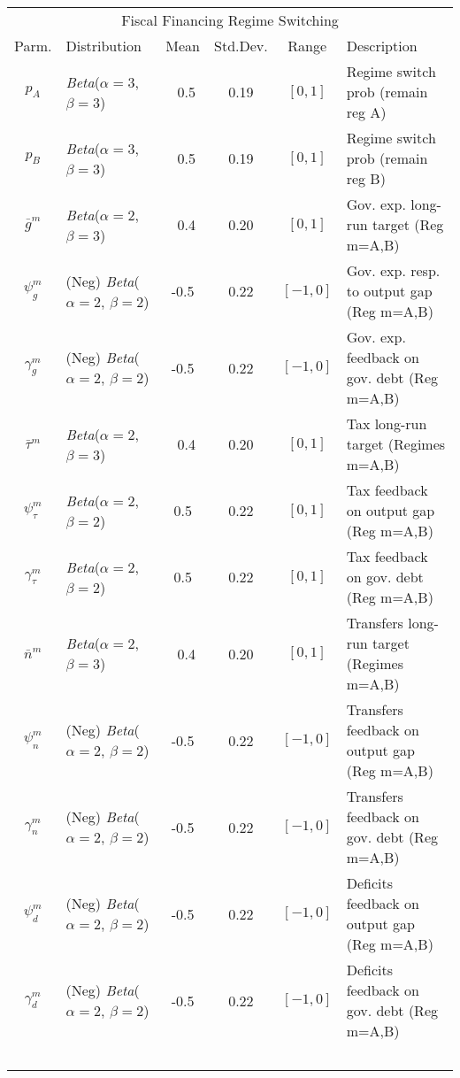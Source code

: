 \documentclass[11pt]{article}
\begin{document}
\begin{table}
\begin{small}
\begin{tabular}{clcccl}
      \multicolumn{6}{c}{Fiscal Financing Regime Switching} \\
      Parm. & Distribution & Mean & Std.Dev. & Range & Description\\ \hline
      $p_A$ & \textit{Beta}($\alpha=3$, $\beta=3$) & ~0.5 & 0.19 & $[0,1]$ & Regime switch prob (remain reg A) \\ [0.3pc]
      $p_B$ & \textit{Beta}($\alpha=3$, $\beta=3$) & ~0.5 & 0.19 & $[0,1]$ & Regime switch prob (remain reg B)\\ [0.3pc]
      $\bar{g}^m$ & \textit{Beta}($\alpha=2$, $\beta=3$) & ~0.4 & 0.20 & $[0,1]$ & Gov. exp. long-run target (Reg m=A,B)   \\ [0.3pc]
      $\psi_g^m$ & (Neg) \textit{Beta}($\alpha=2$, $\beta=2$) & -0.5 & 0.22 & $[-1,0]$ & Gov. exp. resp. to output gap (Reg m=A,B) \\ [0.3pc]
      $\gamma_g^m$ & (Neg) \textit{Beta}($\alpha=2$, $\beta=2$) & -0.5 & 0.22 & $[-1,0]$ & Gov. exp. feedback on gov. debt (Reg m=A,B) \\ [0.3pc]
      $\bar{\tau}^m$ & \textit{Beta}($\alpha=2$, $\beta=3$) & ~0.4 & 0.20 & $[0,1]$ & Tax long-run target (Regimes m=A,B)   \\ [0.3pc]
      $\psi_\tau^m$ & \textit{Beta}($\alpha=2$, $\beta=2$) & 0.5 & 0.22 & $[0,1]$ & Tax feedback on output gap (Reg m=A,B) \\ [0.3pc]
      $\gamma_\tau^m$ & \textit{Beta}($\alpha=2$, $\beta=2$) & 0.5 & 0.22 & $[0,1]$ & Tax feedback on gov. debt (Reg m=A,B) \\ [0.3pc]
      $\bar{n}^m$ & \textit{Beta}($\alpha=2$, $\beta=3$) & ~0.4 & 0.20 & $[0,1]$ & Transfers long-run target (Regimes m=A,B)   \\ [0.3pc]
      $\psi_n^m$ & (Neg) \textit{Beta}($\alpha=2$, $\beta=2$) & -0.5 & 0.22 & $[-1,0]$ & Transfers feedback on output gap (Reg m=A,B)  \\ [0.3pc]
      $\gamma_n^m$ & (Neg) \textit{Beta}($\alpha=2$, $\beta=2$) & -0.5 & 0.22 & $[-1,0]$ & Transfers feedback on gov. debt (Reg m=A,B)  \\ [0.3pc]
      $\psi_d^m$ & (Neg) \textit{Beta}($\alpha=2$, $\beta=2$) & -0.5 & 0.22 & $[-1,0]$ & Deficits feedback on output gap (Reg m=A,B) \\ [0.3pc]
      $\gamma_d^m$ & (Neg) \textit{Beta}($\alpha=2$, $\beta=2$) & -0.5 & 0.22 & $[-1,0]$ & Deficits feedback on gov. debt (Reg m=A,B) \\ [0.3pc] \hline
      \ \\ [0.7pc]
      

\end{tabular}
\end{small}
\end{table}
\end{document}
